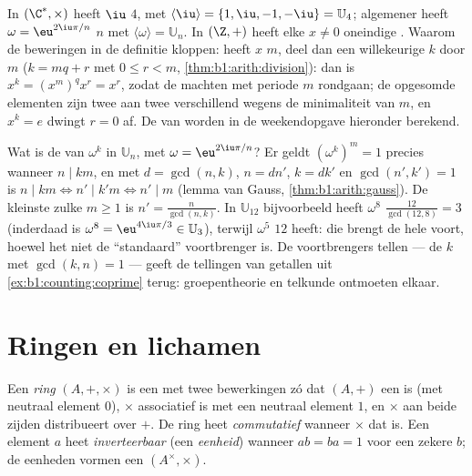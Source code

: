 \begin{example}\label{ex:b1:structures:order}
In $(\C^*, \times)$ heeft $\iu$  $4$, met $\langle \iu \rangle = \{1,
\iu, -1, -\iu\} = \mathbb{U}_4$; algemener heeft $\omega =
\eu^{2\iu\pi/n}$  $n$ met $\langle\omega\rangle = \mathbb{U}_n$. In
$(\Z, +)$ heeft elke $x \neq 0$ oneindige . Waarom de beweringen in de
definitie kloppen: heeft $x$  $m$, deel dan een willekeurige $k$ door
$m$ ($k = mq + r$ met $0 \leq r < m$, \cref{thm:b1:arith:division}): dan
is $x^k = (x^m)^q x^r = x^r$, zodat de machten met periode $m$ rondgaan;
de opgesomde elementen zijn twee aan twee verschillend wegens de
minimaliteit van $m$, en $x^k = e$ dwingt $r = 0$ af. De  van
 worden in de weekendopgave hieronder berekend.
\end{example}

\begin{example}\label{ex:b1:structures:orderU12}
Wat is de  van $\omega^k$ in $\mathbb U_n$, met $\omega =
\eu^{2\iu\pi/n}$? Er geldt $(\omega^k)^m = 1$ precies wanneer $n \mid
km$, en met $d = \gcd(n, k)$, $n = dn'$, $k = dk'$ en $\gcd(n', k') = 1$
is $n \mid km \iff n' \mid k'm \iff n' \mid m$ (lemma van Gauss,
\cref{thm:b1:arith:gauss}). De kleinste zulke $m \geq 1$ is $n' =
\frac{n}{\gcd(n,k)}$. In $\mathbb U_{12}$ bijvoorbeeld heeft $\omega^8$
 $\frac{12}{\gcd(12,8)} = 3$ (inderdaad is $\omega^8 =
\eu^{4\iu\pi/3} \in \mathbb U_3$), terwijl $\omega^5$  $12$ heeft:
die brengt de hele  voort, hoewel het niet de ``standaard''
voortbrenger is. De voortbrengers tellen --- de $k$ met $\gcd(k, n) = 1$
--- geeft de tellingen van  getallen uit
\cref{ex:b1:counting:coprime} terug: groepentheorie en telkunde ontmoeten
elkaar.
\end{example}

\section{Ringen en lichamen}

\begin{definition}[Ring]\label{def:b1:structures:ring}
Een \emph{ring} $(A, +, \times)$ is een  met twee
bewerkingen zó dat $(A, +)$ een  is (met neutraal element
$0$), $\times$ associatief is met een neutraal element $1$, en $\times$
aan beide zijden distribueert over $+$. De ring heet \emph{commutatief}
wanneer $\times$ dat is. Een element $a$ heet \emph{inverteerbaar} (een
\emph{eenheid}) wanneer $ab = ba = 1$ voor een zekere $b$; de eenheden
vormen een  $(A^\times, \times)$.
\end{definition}

